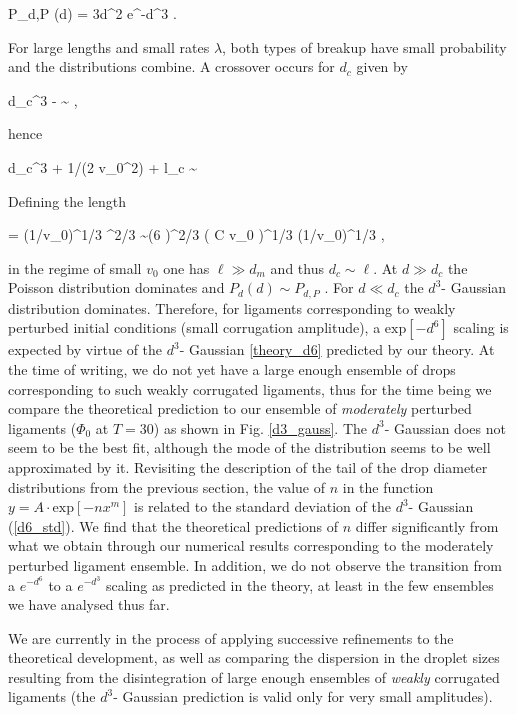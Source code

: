 \be
  P_{d,P} (d) = {3d^2} \lambda e^{-\lambda d^3} \label{PP} .
\nd

For large lengths and small rates $\lambda$, both types of breakup have small probability and the distributions
  combine. A crossover occurs for $d_c$ given by

\be
  {\lambda d_c^3} - \ln \lambda  \sim {} , 
\nd

hence

\be
  {\lambda d_c^3} + 1/(2 v_0^2) + \ln l_c \sim {} 
\nd 

Defining the length

\be
  \ell = (1/v_0)^{1/3} \sigma^{2/3} \sim   (6  \pi)^{2/3} \left(  {C \ln v_0} \right)^{1/3}  (1/v_0)^{1/3} , 
\nd

in the regime of small $v_0$ one has $\ell \gg d_m$ and thus $d_c \sim \ell$. At $d \gg d_c$ the Poisson distribution
dominates and $P_d(d) \sim P_{d,P}$ . 
For $d \ll d_c$ the $d^3$- Gaussian distribution dominates. 
Therefore, for ligaments corresponding to weakly perturbed initial 
conditions (small corrugation amplitude), a $\textrm{exp}[-d^6]$ 
scaling is expected by virtue of the $d^3$- Gaussian \eqref{theory_d6} predicted by our theory.   
At the time of writing, we do not yet have a large enough ensemble of drops
corresponding to such weakly corrugated ligaments, thus for the time being 
we compare the theoretical prediction to our ensemble of \textit{moderately} 
perturbed ligaments ($\Phi_0$ at $T=30$) as shown in Fig. \ref{d3_gauss}.
The $d^3$- Gaussian does not seem to be the best fit, although  
the mode of the distribution seems to be well approximated by it. 
Revisiting the description of the tail of the drop diameter distributions from 
the previous section, the value of $n$ in the function $y = A\cdot \textrm{exp}[-nx^m]$
is related to the standard deviation of the $d^3$- Gaussian (\eqref{d6_std}). 
We find that the theoretical predictions of $n$ differ significantly 
from what we obtain through our numerical results corresponding to the moderately perturbed ligament ensemble. 
In addition, we do not observe the transition from a $e^{-d^6}$ to a $e^{-d^3}$ scaling 
as predicted in the theory, at least in the few ensembles we have analysed thus far. 

We are currently in the process of applying successive refinements to the 
theoretical development, as well as comparing the dispersion in the droplet sizes 
resulting from the disintegration of large enough ensembles of \textit{weakly} corrugated 
ligaments (the $d^3$- Gaussian prediction is valid only for very small amplitudes).  



